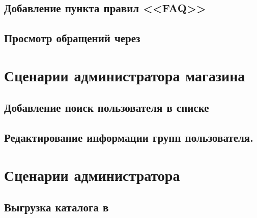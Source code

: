         \subsection{Добавление пункта правил <<FAQ>>}
        \subsection{Просмотр обращений через }

    \section{Сценарии администратора магазина}

        \subsection{Добавление поиск пользователя в списке}
        \subsection{Редактирование информации групп пользователя.}

    \section{Сценарии администратора }

        \subsection{Выгрузка каталога  в }





